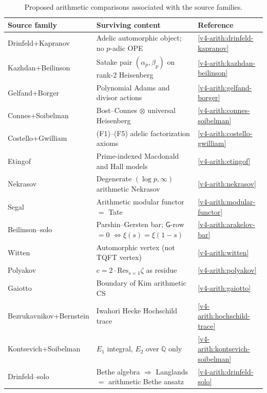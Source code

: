 \begin{table}[h]
\centering
\begin{tabular}{l|l|l}
Source family & Surviving content & Reference \\
\hline
Drinfeld+Kapranov & Adelic automorphic object; no \(p\)-adic OPE & \ref{v4-arith:drinfeld-kapranov} \\
Kazhdan+Beilinson & Satake pair \((\alpha_{p},\beta_{p})\) on rank-\(2\) Heisenberg & \ref{v4-arith:kazhdan-beilinson} \\
Gelfand+Borger & Polynomial Adams and divisor actions & \ref{v4-arith:gelfand-borger} \\
Connes+Soibelman & Bost--Connes \(\otimes\) universal Heisenberg & \ref{v4-arith:connes-soibelman} \\
Costello+Gwilliam & (F1)--(F5) adelic factorization axioms & \ref{v4-arith:costello-gwilliam} \\
Etingof & Prime-indexed Macdonald and Hall models & \ref{v4-arith:etingof} \\
Nekrasov & Degenerate \((\log p,\infty)\) arithmetic Nekrasov & \ref{v4-arith:nekrasov} \\
Segal & Arithmetic modular functor \(=\) Tate & \ref{v4-arith:modular-functor} \\
Beilinson--solo & Parshin--Gersten bar; \(\mathsf{G}\)-row \(=0\) \(\Leftrightarrow\xi(s)=\xi(1-s)\) & \ref{v4-arith:arakelov-bar} \\
Witten & Automorphic vertex (not TQFT vertex) & \ref{v4-arith:witten} \\
Polyakov & \(c=2\cdot\mathrm{Res}_{s=1}\zeta\) as residue & \ref{v4-arith:polyakov} \\
Gaiotto & Boundary of Kim arithmetic CS & \ref{v4-arith:gaiotto} \\
Bezrukavnikov+Bernstein & Iwahori Hecke Hochschild trace & \ref{v4-arith:hochschild-trace} \\
Kontsevich+Soibelman & \(E_{1}\) integral, \(E_{2}\) over \(\mathbb{Q}\) only & \ref{v4-arith:kontsevich-soibelman} \\
Drinfeld--solo & Bethe algebra \(\Rightarrow\) Langlands \(=\) arithmetic Bethe ansatz & \ref{v4-arith:drinfeld-solo}
\end{tabular}
\caption{Proposed arithmetic comparisons associated with the source families.}
\label{v4-arith:table:convergence}
\end{table}

